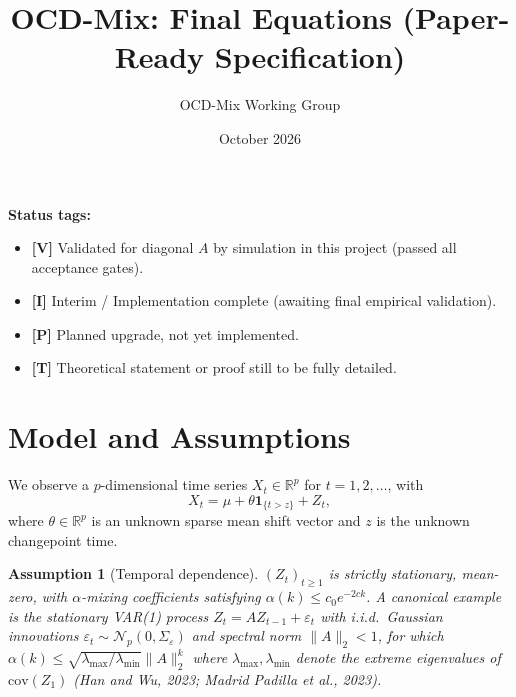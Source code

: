 \documentclass[11pt]{article}
\title{OCD-Mix: Final Equations (Paper-Ready Specification)}
\author{OCD-Mix Working Group}
\date{October 2026}
\newtheorem{assumption}{Assumption}
\begin{document}
\maketitle

\noindent\textbf{Status tags:}
\begin{itemize}
    \item \textbf{[V]} Validated for diagonal $A$ by simulation in this project (passed all acceptance gates).
    \item \textbf{[I]} Interim / Implementation complete (awaiting final empirical validation).
    \item \textbf{[P]} Planned upgrade, not yet implemented.
    \item \textbf{[T]} Theoretical statement or proof still to be fully detailed.
\end{itemize}

\section{Model and Assumptions}
We observe a $p$-dimensional time series $X_t \in \mathbb{R}^p$ for $t = 1, 2, \ldots$, with
\begin{equation}
    X_t = \mu + \theta \mathbf{1}_{\{t > z\}} + Z_t, \label{eq:model}
\end{equation}
where $\theta \in \mathbb{R}^p$ is an unknown sparse mean shift vector and $z$ is the unknown changepoint time.

\begin{assumption}[Temporal dependence]
    $(Z_t)_{t \ge 1}$ is strictly stationary, mean-zero, with $\alpha$-mixing coefficients satisfying $\alpha(k) \le c_0 e^{-2ck}$. A canonical example is the stationary VAR(1) process $Z_t = A Z_{t-1} + \varepsilon_t$ with i.i.d.\ Gaussian innovations $\varepsilon_t \sim \mathcal{N}_p(0, \Sigma_\varepsilon)$ and spectral norm $\|A\|_2 < 1$, for which $\alpha(k) \le \sqrt{\lambda_{\max} / \lambda_{\min}} \|A\|_2^k$ where $\lambda_{\max}, \lambda_{\min}$ denote the extreme eigenvalues of $\text{cov}(Z_1)$ (Han and Wu, 2023; Madrid Padilla et al., 2023).
\end{assumption}
\end{document}
